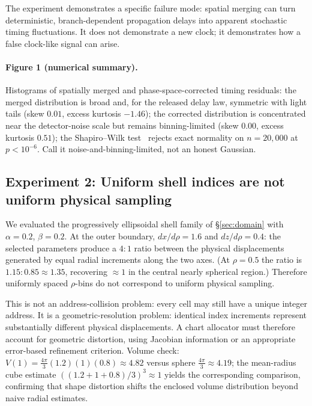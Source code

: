 \documentclass[11pt]{article}
\begin{document}
The experiment demonstrates a specific failure mode: spatial merging can turn
deterministic, branch-dependent propagation delays into apparent stochastic timing
fluctuations. It does not demonstrate a new clock; it demonstrates how a false
clock-like signal can arise.

\paragraph{Figure 1 (numerical summary).} Histograms of spatially merged and
phase-space-corrected timing residuals: the merged distribution is broad and, for the
released delay law, symmetric with light tails (skew $0.01$, excess kurtosis $-1.46$); the
corrected distribution is concentrated near
the detector-noise scale but remains binning-limited (skew $0.00$, excess kurtosis
$0.51$); the Shapiro--Wilk test~\cite{shapiro1965} rejects exact normality on
$n=20{,}000$ at
$p<10^{-6}$. Call it noise-and-binning-limited, not an honest Gaussian.

\subsection{Experiment 2: Uniform shell indices are not uniform physical sampling}

We evaluated the progressively ellipsoidal shell family of \S\ref{sec:domain} with
$\alpha = 0.2$, $\beta = 0.2$. At the outer boundary,
$dx/d\rho = 1.6$ and $dz/d\rho = 0.4$: the selected parameters produce a $4{:}1$ ratio
between the physical displacements generated by equal radial increments along the two
axes. (At $\rho = 0.5$ the ratio is $1.15{:}0.85 \approx 1.35$, recovering $\approx 1$ in
the central nearly spherical region.) Therefore uniformly
spaced $\rho$-bins do not correspond to uniform physical sampling.

This is not an address-collision problem: every cell may still have a unique integer
address. It is a geometric-resolution problem: identical index increments represent
substantially different physical displacements. A chart allocator must therefore account
for geometric distortion, using Jacobian information or an appropriate error-based
refinement criterion. Volume check: $V(1) = \frac{4\pi}{3}(1.2)(1)(0.8) \approx 4.82$
versus sphere $\frac{4\pi}{3} \approx 4.19$; the mean-radius cube estimate
$((1.2+1+0.8)/3)^3 \approx 1$ yields the corresponding comparison, confirming that
shape distortion shifts the enclosed volume distribution beyond naive radial estimates.
\end{document}
